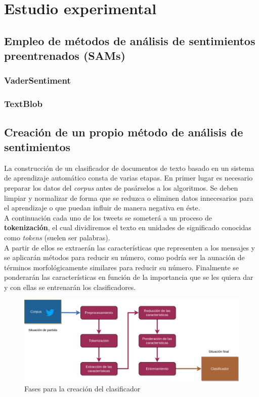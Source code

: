 \documentclass[a4paper,12pt]{report}
\begin{document}
\chapter{Estudio experimental}


\section{Empleo de métodos de análisis de sentimientos preentrenados (SAMs)}

\subsection{VaderSentiment}

\subsection{TextBlob}



\section{Creación de un propio método de análisis de sentimientos}

La construcción de un clasificador de documentos de texto basado en un sistema de aprendizaje automático consta de varias etapas. En primer lugar es necesario preparar los datos del \textit{corpus} antes de pasárselos a los algoritmos. Se deben limpiar y normalizar de forma que se reduzca o eliminen datos innecesarios para el aprendizaje o que puedan influir de manera negativa en éste.
\vspace{2mm}\\
A continuación cada uno de los tweets se someterá a un proceso de \textbf{tokenización}, el cual dividiremos el texto en unidades de significado conocidas como \textit{tokens} (suelen ser palabras).\vspace{2mm}\\
A partir de ellos se extraerán las características que representen a los mensajes y se aplicarán métodos para reducir su número, como podría ser la aunación de términos morfológicamente similares para reducir su número. Finalmente se ponderarán las características en función de la importancia que se les quiera dar y con ellas se entrenarán los clasificadores. 

\vspace{4mm}
\begin{figure}[htbp!]
\centering
\includegraphics[scale=0.65]{images/Fases_SA.png}
\caption{Fases para la creación del clasificador}
\end{figure}
\vspace{2mm}
\end{document}
